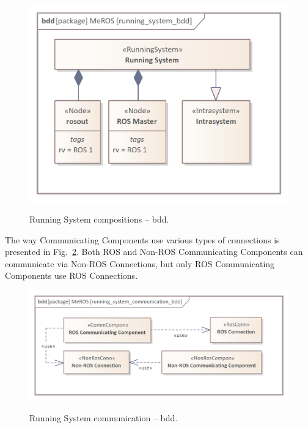 \documentclass{ieeeaccess}
\begin{document}
	\begin{figure}[htb]
		\centering
		\begin{center}
			{\includegraphics[scale=0.73]{img/meros_pkg/running_system_bdd.png}}
		\end{center}
		\caption{Running System compositions -- bdd.} 
		\label{fig:running_system_bdd}
	\end{figure}
	
	The way Communicating Components use various types of connections is presented in Fig.~\ref{fig:running_system_communication_bdd}. Both ROS and Non-ROS Communicating Components can communicate via Non-ROS Connections, but only ROS Communicating Components use ROS Connections.

	\begin{figure}[htb]
		\centering
		\begin{center}
			{\includegraphics[scale=0.7]{img/meros_pkg/running_system_communication_bdd.png}}
		\end{center}
		\caption{Running System communication -- bdd.} 
		\label{fig:running_system_communication_bdd}
	\end{figure}
\end{document}
